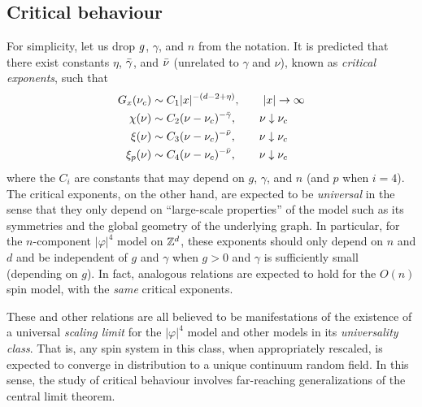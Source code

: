 \subsection{Critical behaviour}

For simplicity, let us drop $g$, $\gamma$, and $n$ from the notation.
It is predicted that there exist constants $\eta$, $\bar\gamma$, and $\bar\nu$
(unrelated to $\gamma$ and $\nu$), known as \emph{critical exponents}, such that
\begin{align}
\label{e:Gpred}
G_x(\nu_c)
	&\sim
C_1 |x|^{-(d - 2 + \eta)},
	\qquad
|x|\rightarrow\infty \\
\chi(\nu)
	&\sim
C_2 (\nu - \nu_c)^{-\bar\gamma},
	\qquad
\nu\downarrow\nu_c \\
\xi(\nu)
	&\sim
C_3 (\nu - \nu_c)^{-\bar\nu},
	\qquad
\nu\downarrow\nu_c \\
\label{e:xippred}
\xi_p(\nu)
	&\sim
C_4 (\nu - \nu_c)^{-\bar\nu},
	\qquad
\nu\downarrow\nu_c
\end{align}
where the $C_i$ are constants that may depend on $g$, $\gamma$, and $n$ (and $p$ when $i = 4$).
The critical exponents, on the other hand, are expected to be \emph{universal} in the
sense that they only depend on ``large-scale properties'' of the model such as its
symmetries and the global geometry of the underlying graph. In particular,
for the $n$-component $|\varphi|^4$ model on ${ {{\mathbb Z}}^d }$, these exponents should only
depend on $n$ and $d$ and be independent of $g$ and $\gamma$ when $g > 0$ and $\gamma$
is sufficiently small (depending on $g$). In fact,
analogous relations are expected to hold for the $O(n)$ spin model, with the
\emph{same} critical exponents.

These and other relations are all believed to be manifestations of the existence of
a universal \emph{scaling limit} for the $|\varphi|^4$ model and other models in its
\emph{universality class}. That is, any spin system in this class, when appropriately
rescaled, is expected to converge in distribution to a unique continuum random field.
In this sense, the study of critical behaviour involves far-reaching generalizations
of the central limit theorem.

